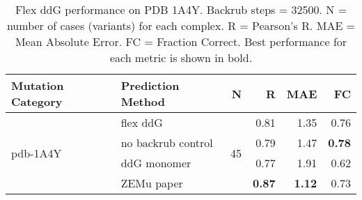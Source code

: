 \begin{table}
  \begin{tabular}{llrrrr}
\toprule
Mutation Category &   Prediction Method &   N &    R &  MAE &   FC \\
\midrule
 \multirow{ 4}{*}{pdb-1A4Y} & flex ddG & \multirow{ 4}{*}{45} & 0.81 & 1.35 & 0.76  \\
 & no backrub control & & 0.79 & 1.47 & \textbf{0.78}  \\
 & ddG monomer & & 0.77 & 1.91 & 0.62  \\
 & ZEMu paper & & \textbf{0.87} & \textbf{1.12} & 0.73  \\
\bottomrule
\end{tabular}
  \caption[Flex ddG performance on PDB 1A4Y]{
    Flex ddG performance on PDB 1A4Y. Backrub steps = 32500. N = number of cases (variants) for each complex. R = Pearson's R. MAE = Mean Absolute Error. FC = Fraction Correct. Best performance for each metric is shown in bold.
  } \label{tab:table-pdb-1A4Y}
\end{table}
